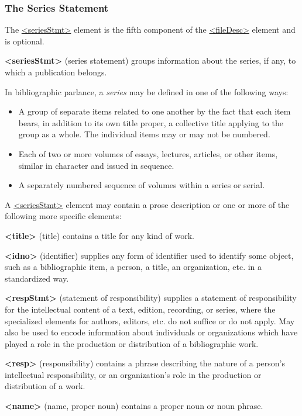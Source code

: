 \subsubsection[{The Series Statement}]{The Series Statement}\label{HD26}\par
The \hyperref[TEI.seriesStmt]{<seriesStmt>} element is the fifth component of the \hyperref[TEI.fileDesc]{<fileDesc>} element and is optional. 
\begin{sansreflist}
  
\item [\textbf{<seriesStmt>}] (series statement) groups information about the series, if any, to which a publication belongs.
\end{sansreflist}
\par
In bibliographic parlance, a \textit{series} may be defined in one of the following ways: \begin{itemize}
\item A group of separate items related to one another by the fact that each item bears, in addition to its own title proper, a collective title applying to the group as a whole. The individual items may or may not be numbered.
\item Each of two or more volumes of essays, lectures, articles, or other items, similar in character and issued in sequence.
\item A separately numbered sequence of volumes within a series or serial.
\end{itemize}  A \hyperref[TEI.seriesStmt]{<seriesStmt>} element may contain a prose description or one or more of the following more specific elements: 
\begin{sansreflist}
  
\item [\textbf{<title>}] (title) contains a title for any kind of work.
\item [\textbf{<idno>}] (identifier) supplies any form of identifier used to identify some object, such as a bibliographic item, a person, a title, an organization, etc. in a standardized way.
\item [\textbf{<respStmt>}] (statement of responsibility) supplies a statement of responsibility for the intellectual content of a text, edition, recording, or series, where the specialized elements for authors, editors, etc. do not suffice or do not apply. May also be used to encode information about individuals or organizations which have played a role in the production or distribution of a bibliographic work.
\item [\textbf{<resp>}] (responsibility) contains a phrase describing the nature of a person's intellectual responsibility, or an organization's role in the production or distribution of a work.
\item [\textbf{<name>}] (name, proper noun) contains a proper noun or noun phrase.
\end{sansreflist}
